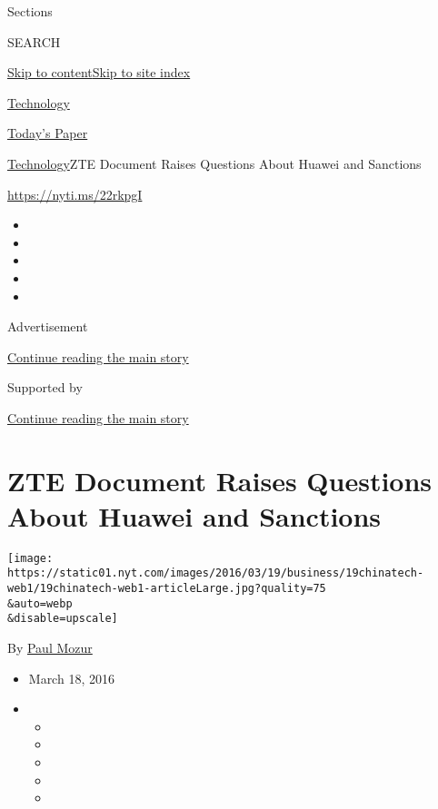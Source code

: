 Sections

SEARCH

\protect\hyperlink{site-content}{Skip to
content}\protect\hyperlink{site-index}{Skip to site index}

\href{https://www.nytimes.com/section/technology}{Technology}

\href{https://myaccount.nytimes.com/auth/login?response_type=cookie\&client_id=vi}{}

\href{https://www.nytimes.com/section/todayspaper}{Today's Paper}

\href{/section/technology}{Technology}\textbar{}ZTE Document Raises
Questions About Huawei and Sanctions

\url{https://nyti.ms/22rkpgI}

\begin{itemize}
\item
\item
\item
\item
\item
\end{itemize}

Advertisement

\protect\hyperlink{after-top}{Continue reading the main story}

Supported by

\protect\hyperlink{after-sponsor}{Continue reading the main story}

\hypertarget{zte-document-raises-questions-about-huawei-and-sanctions}{%
\section{ZTE Document Raises Questions About Huawei and
Sanctions}\label{zte-document-raises-questions-about-huawei-and-sanctions}}

\texttt{[image: https://static01.nyt.com/images/2016/03/19/business/19chinatech-web1/19chinatech-web1-articleLarge.jpg?quality=75\\\&auto=webp\\\&disable=upscale]}

By \href{https://www.nytimes.com/by/paul-mozur}{Paul Mozur}

\begin{itemize}
\item
  March 18, 2016
\item
  \begin{itemize}
  \item
  \item
  \item
  \item
  \item
  \end{itemize}
\end{itemize}

